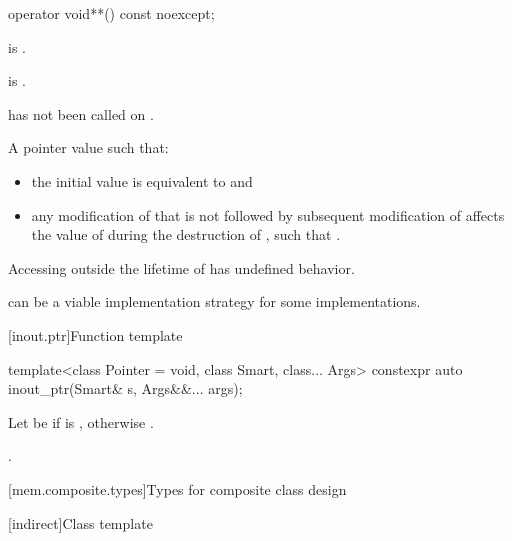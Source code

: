 \begin{itemdecl}
operator void**() const noexcept;
\end{itemdecl}

\begin{itemdescr}
\pnum
\constraints
{} is .

\pnum
\mandates
{} is .

\pnum
\expects
{} has not been called on .

\pnum
\returns
A pointer value  such that:
\begin{itemize}
\item
the initial value  is equivalent to  and
\item
any modification of 
that is not followed by subsequent modification of 
affects the value of  during the destruction of ,
such that .
\end{itemize}

\pnum
\remarks
Accessing  outside the lifetime of 
has undefined behavior.

\pnum
\begin{note}
can be a viable implementation strategy for some implementations.
\end{note}
\end{itemdescr}

[inout.ptr]{Function template }

%
\begin{itemdecl}
template<class Pointer = void, class Smart, class... Args>
  constexpr auto inout_ptr(Smart& s, Args&&... args);
\end{itemdecl}

\begin{itemdescr}
\pnum
Let  be  if  is ,
otherwise .

\pnum
\returns
{}.
\end{itemdescr}

[mem.composite.types]{Types for composite class design}

[indirect]{Class template }


